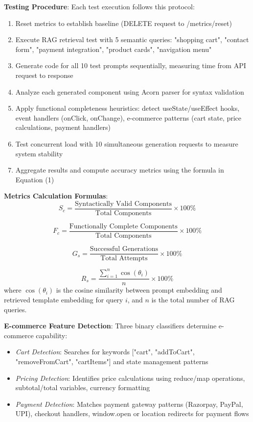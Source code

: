 \documentclass[10pt, conference, letterpaper]{IEEEtran}
\begin{document}
\textbf{Testing Procedure}: Each test execution follows this protocol:
\begin{enumerate}
    \item Reset metrics to establish baseline (DELETE request to /metrics/reset)
    \item Execute RAG retrieval test with 5 semantic queries: "shopping cart", "contact form", "payment integration", "product cards", "navigation menu"
    \item Generate code for all 10 test prompts sequentially, measuring time from API request to response
    \item Analyze each generated component using Acorn parser for syntax validation
    \item Apply functional completeness heuristics: detect useState/useEffect hooks, event handlers (onClick, onChange), e-commerce patterns (cart state, price calculations, payment handlers)
    \item Test concurrent load with 10 simultaneous generation requests to measure system stability
    \item Aggregate results and compute accuracy metrics using the formula in Equation (1)
\end{enumerate}

\textbf{Metrics Calculation Formulas}:
\begin{equation}
S_c = \frac{\text{Syntactically Valid Components}}{\text{Total Components}} \times 100\%
\end{equation}

\begin{equation}
F_c = \frac{\text{Functionally Complete Components}}{\text{Total Components}} \times 100\%
\end{equation}

\begin{equation}
G_s = \frac{\text{Successful Generations}}{\text{Total Attempts}} \times 100\%
\end{equation}

\begin{equation}
R_s = \frac{\sum_{i=1}^{n} \cos(\theta_i)}{n} \times 100\%
\end{equation}
where $\cos(\theta_i)$ is the cosine similarity between prompt embedding and retrieved template embedding for query $i$, and $n$ is the total number of RAG queries.

\textbf{E-commerce Feature Detection}: Three binary classifiers determine e-commerce capability:
\begin{itemize}
    \item \textit{Cart Detection}: Searches for keywords ["cart", "addToCart", "removeFromCart", "cartItems"] and state management patterns
    \item \textit{Pricing Detection}: Identifies price calculations using reduce/map operations, subtotal/total variables, currency formatting
    \item \textit{Payment Detection}: Matches payment gateway patterns (Razorpay, PayPal, UPI), checkout handlers, window.open or location redirects for payment flows
\end{itemize}
\end{document}
